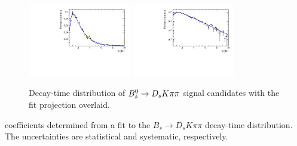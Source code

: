 \begin{figure}[h]
	\centering
		\includegraphics[width=0.4\textwidth, height = !]{figs/timeFit/signal/h_t.pdf} 
		\includegraphics[width=0.4\textwidth, height = !]{figs/timeFit/signal/h_t_log.pdf} 
		\caption{Decay-time distribution of ${{B}^0_{s}}\rightarrow{\ensuremath{{D}_{s}}}{\ensuremath{K}}{\ensuremath{\pi}}{\ensuremath{\pi}}$ signal candidates with the fit projection overlaid.} 
		\label{fig:tFitSig}
\end{figure}	

\begin{table}[h]
\centering
\caption{\CP coefficients determined from a fit to the $B_s \to D_s K \pi\pi$ decay-time distribution. The uncertainties are statistical and systematic, respectively.}
	\renewcommand{\arraystretch}{1.5}
	
\label{tab:sigFitResults}
\end{table}


